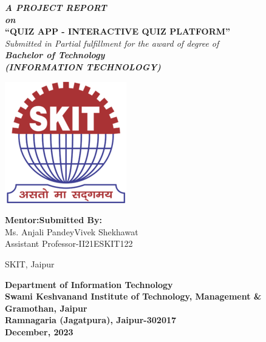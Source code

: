 \newpage
\begin{center}
\thispagestyle{empty}
\Large{\textbf{ \emph{A PROJECT REPORT}}\\[0.3cm]}
\Large{\textbf{ \emph{on}}\\[0.3cm]}
\LARGE{\textsc {\textbf{``QUIZ APP - INTERACTIVE QUIZ PLATFORM''}}}\\[0.3cm]

\vspace{.30cm}
\emph{Submitted in Partial fulfillment for the award of degree of}\\
\vspace{.30cm}
\textbf{\emph{Bachelor of Technology}}\\
\textbf{\emph{(INFORMATION TECHNOLOGY)}}\\[0.3cm]

\vspace{1cm}

\centering
\includegraphics[scale=0.8]{project/images/download}\\

\vspace{1cm}

\Large{\textbf{Mentor:\hspace{11cm}Submitted By:}}\\
\Large{Ms. Anjali Pandey\hspace{8cm}Vivek Shekhawat}\\
\Large{Assistant Professor-II\hspace{8.4cm}21ESKIT122}\\
\raggedright
\Large{SKIT, Jaipur}\\
\vspace{3cm}

\centering

\Large{\textbf{Department of Information Technology}}\\
\vspace{0.3cm}
\Large{\textbf{Swami Keshvanand Institute of Technology, Management \& Gramothan, Jaipur }}\\
\vspace{0.3cm}
\Large{\textbf{Ramnagaria (Jagatpura), Jaipur-302017}}
\vspace{0.3cm}
\large{\textbf{\\December, 2023}}\\
\vspace{3cm}


\end{center}